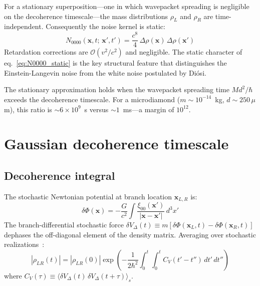 \documentclass[12pt,a4paper]{article}
\begin{document}
For a stationary superposition---one in which wavepacket spreading is negligible on the
decoherence timescale---the mass distributions $\rho_L$ and $\rho_R$ are
time-independent. Consequently the noise kernel is static:
\begin{equation}
N_{0000}(\mathbf{x},t;\,\mathbf{x}',t') = \frac{c^8}{4}\,\Delta\rho(\mathbf{x})\,\Delta\rho(\mathbf{x}')
\label{eq:N0000_static}
\end{equation}
Retardation corrections are $\mathcal{O}(v^2/c^2)$ and negligible. The static character
of eq.~\eqref{eq:N0000_static} is the key structural feature that distinguishes the
Einstein-Langevin noise from the white noise postulated by Di\'osi.

The stationary approximation holds when the wavepacket spreading time $Md^2/\hbar$ exceeds
the decoherence timescale. For a microdiamond ($m \sim 10^{-14}$~kg, $d \sim 250\,\mu$m),
this ratio is $\sim 6\times10^9$~s versus $\sim 1$~ms---a margin of $10^{12}$.

\section{Gaussian decoherence timescale}
\label{sec:gaussian}

\subsection{Decoherence integral}

The stochastic Newtonian potential at branch location $\mathbf{x}_{L,R}$ is:
\begin{equation}
\delta\Phi(\mathbf{x}) = -\frac{G}{c^2}\int \frac{\xi_{00}(\mathbf{x}')}{|\mathbf{x}-\mathbf{x}'|}\,d^3x'
\end{equation}
The branch-differential stochastic force $\delta V_\Delta(t) \equiv m[\delta\Phi(\mathbf{x}_L,t) - \delta\Phi(\mathbf{x}_R,t)]$ dephases the off-diagonal element of the density matrix. Averaging over stochastic realizations~\cite{hu_verdaguer}:
\begin{equation}
|\rho_{LR}(t)| = |\rho_{LR}(0)|\exp\!\left(-\frac{1}{2\hbar^2}\int_0^t\!\!\int_0^t
C_V(t'-t'')\,dt'\,dt''\right)
\label{eq:decoherence_integral}
\end{equation}
where $C_V(\tau) \equiv \langle\delta V_\Delta(t)\,\delta V_\Delta(t+\tau)\rangle_s$.
\end{document}
